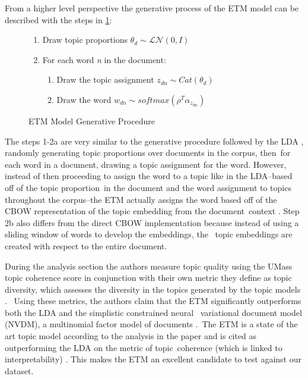 \documentclass[letterpaper,12pt]{article}
\begin{document}
From a higher level perspective the generative process of the ETM model can be described with the steps in \ref{eqn:etm-procedure}:
\begin{figure}
	
	\begin{enumerate}
		\item Draw topic proportions $\theta_d \sim \mathcal{L}\mathcal{N}(0,I)$
		\item For each word \emph{n} in the document:
		\begin{enumerate}
			\item Draw the topic assignment $z_{dn} \sim Cat(\theta_d)$
			\item Draw the word $w_{dn} \sim softmax(\rho^T\alpha_{z_{dn}})$
		\end{enumerate}
	\end{enumerate}
	\caption{ETM Model Generative Procedure \cite{dieng2019topic}}
	\label{eqn:etm-procedure}
\end{figure}

The steps 1-2a are very similar to the generative procedure followed by the LDA \cite{blei2003latent}, randomly generating topic proportions over documents in the corpus, then\
for each word in a document, drawing a topic assignment for the word. However, instead of then proceeding to assign the word to a topic like in the LDA--based off of the topic proportion\
in the document and the word assignment to topics throughout the corpus--the ETM actually assigns the word based off of the CBOW representation of the topic embedding from the document\
context \cite{dieng2019topic}. Step 2b also differs from the direct CBOW implementation because instead of using a sliding window of words to develop the embeddings, the \
topic embeddings are created with respect to the entire document. 

During the analysis section the authors measure topic quality using the UMass topic coherence score \cite{mimno2011optimizing} in conjunction with their own
metric they define as topic diversity, which assesses the diversity in the topics generated by the topic models \cite{dieng2019topic}. \
Using these metrics, the authors claim that the ETM significantly outperforms both the LDA and the simplistic constrained neural \
variational document model (NVDM), a multinomial factor model of documents \cite{miao2016neural}.\
The ETM is a state of the art topic model according to the analysis in the paper and is cited as outperforming the LDA on the metric of topic\
coherence (which is linked to interpretability) \cite{mimno2011optimizing}. This makes the ETM an excellent candidate to test against our dataset.
\end{document}
